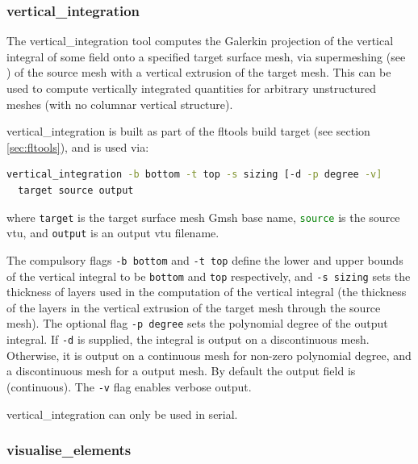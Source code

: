 \subsubsection{vertical\_integration}
\label{sec:vertical_integration}

The vertical\_integration tool computes the Galerkin projection of the vertical
integral of some field onto a specified target surface mesh, via supermeshing (see \citet{farrell2009a,farrell2010a})
of the source mesh with a vertical extrusion of the target mesh. This can be used to
compute vertically integrated quantities for arbitrary unstructured meshes (with
no columnar vertical structure).

vertical\_integration is built as part of the fltools build target (see section \ref{sec:fltools}),
and is used via:

\begin{lstlisting}[language = Bash]
vertical_integration -b bottom -t top -s sizing [-d -p degree -v]
  target source output
\end{lstlisting}

where \lstinline[language = Bash]+target+ is the target surface mesh Gmsh base name,
\lstinline[language = Bash]+source+ is the source vtu, and \lstinline[language = Bash]+output+
is an output vtu filename.

The compulsory flags \lstinline[language = Bash]+-b bottom+
and \lstinline[language = Bash]+-t top+ define the lower and upper bounds of
the vertical integral to be \lstinline[language = Bash]+bottom+ and \lstinline[language = Bash]+top+
respectively, and \lstinline[language = Bash]+-s sizing+ sets the thickness of layers
used in the computation of the vertical integral (the thickness of the layers in the
vertical extrusion of the target mesh through the source mesh). The optional
flag \lstinline[language = Bash]+-p degree+ sets the polynomial degree of the
output integral. If \lstinline[language = Bash]+-d+ is supplied, the integral
is output on a discontinuous mesh. Otherwise, it is output on a continuous
mesh for non-zero polynomial degree, and a discontinuous mesh for a \Pzero
output mesh. By default the output field is \Pone (continuous).
The \lstinline[language = Bash]+-v+ flag enables verbose output.

vertical\_integration can only be used in serial.


\subsubsection{visualise\_elements}
\label{sec:visualise_elements}

